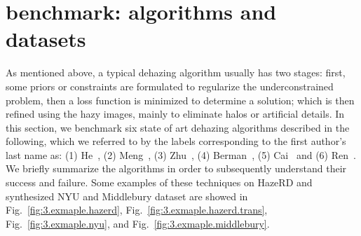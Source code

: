 \section{benchmark: algorithms and datasets}
\label{sec:3.5.benchmark}
As mentioned above, a typical dehazing algorithm usually has two stages: first, some priors or constraints are formulated to regularize the underconstrained problem, then a loss function is minimized to determine a solution; which is then refined using the hazy images, mainly to eliminate halos or artificial details. In this section, we benchmark six state of art dehazing algorithms described in the following, which we referred to by the labels corresponding to the first author's last name as: (1) He~\cite{he2011single}, (2) Meng~\cite{meng2013efficient}, (3) Zhu~\cite{zhu2015fast}, (4) Berman~\cite{berman2016non}, (5) Cai~\cite{cai2016dehazenet} and (6) Ren~\cite{Ren-ECCV-2016}.
We briefly summarize the algorithms in order to subsequently understand their success and failure. Some examples of these techniques on HazeRD and synthesized NYU and Middlebury dataset are showed in Fig.~\ref{fig:3.exmaple.hazerd}, Fig.~\ref{fig:3.exmaple.hazerd.trans}, Fig.~\ref{fig:3.exmaple.nyu}, and Fig.~\ref{fig:3.exmaple.middlebury}.
